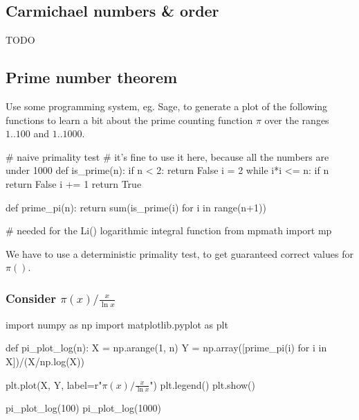 \documentclass{article}
\begin{document}
  \subsection{Carmichael numbers \& order}
  TODO

  \subsection{Prime number theorem}
  \begin{centerframebox}
    Use some programming system, eg. Sage, to generate a plot of the following functions to learn a bit about the prime counting function $\pi$ over the ranges $1..100$ and $1..1000$.
  \end{centerframebox}
  \begin{mylisting}
    # naive primality test
    # it's fine to use it here, because all the numbers are under 1000
    def is_prime(n):
      if n < 2:
        return False
      i = 2
      while i*i <= n:
        if n %
          return False
        i += 1
      return True

    def prime_pi(n):
      return sum(is_prime(i) for i in range(n+1))

    # needed for the Li() logarithmic integral function
    from mpmath import mp
  \end{mylisting}
  We have to use a deterministic primality test, to get guaranteed correct values for $\pi()$.

  \subsubsection{Consider $\pi(x)/\frac{x}{\ln x}$}
  \begin{mylisting}
    import numpy as np
    import matplotlib.pyplot as plt

    def pi_plot_log(n):
      X = np.arange(1, n)
      Y = np.array([prime_pi(i) for i in X])/(X/np.log(X))

      plt.plot(X, Y, label=r"$\pi(x)/\frac{x}{\ln x}$")
      plt.legend()
      plt.show()

    pi_plot_log(100)
    pi_plot_log(1000)
  \end{mylisting}
\end{document}
